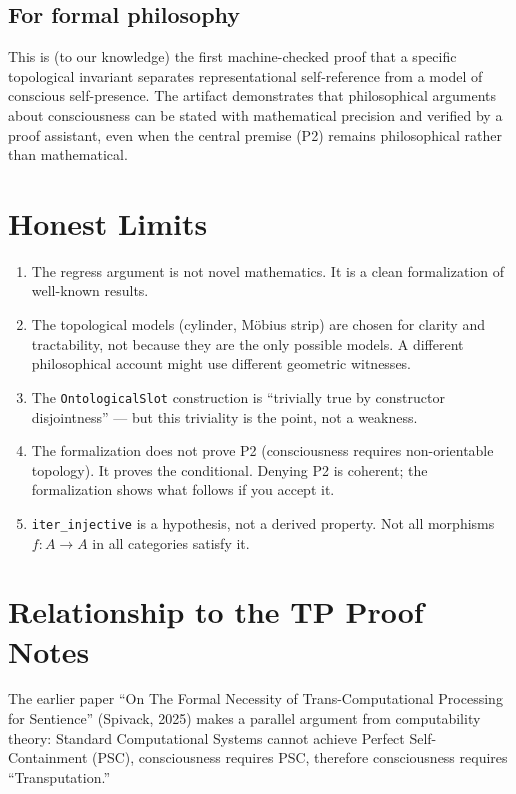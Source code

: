 \documentclass[11pt]{article}
\begin{document}
\subsection{For formal philosophy}

This is (to our knowledge) the first machine-checked proof that a specific
topological invariant separates representational self-reference from a model
of conscious self-presence. The artifact demonstrates that philosophical
arguments about consciousness can be stated with mathematical precision and
verified by a proof assistant, even when the central premise (P2) remains
philosophical rather than mathematical.

\section{Honest Limits}

\begin{enumerate}
\item The regress argument is not novel mathematics. It is a clean formalization
  of well-known results.
\item The topological models (cylinder, M\"obius strip) are chosen for clarity
  and tractability, not because they are the only possible models. A different
  philosophical account might use different geometric witnesses.
\item The \texttt{OntologicalSlot} construction is ``trivially true by
  constructor disjointness'' --- but this triviality is the point, not a weakness.
\item The formalization does not prove P2 (consciousness requires non-orientable
  topology). It proves the conditional. Denying P2 is coherent; the formalization
  shows what follows if you accept it.
\item \texttt{iter\_injective} is a hypothesis, not a derived property. Not all
  morphisms $f : A \to A$ in all categories satisfy it.
\end{enumerate}

\section{Relationship to the TP Proof Notes}

The earlier paper ``On The Formal Necessity of Trans-Computational Processing
for Sentience'' (Spivack, 2025) makes a parallel argument from computability
theory: Standard Computational Systems cannot achieve Perfect Self-Containment
(PSC), consciousness requires PSC, therefore consciousness requires
``Transputation.''
\end{document}
